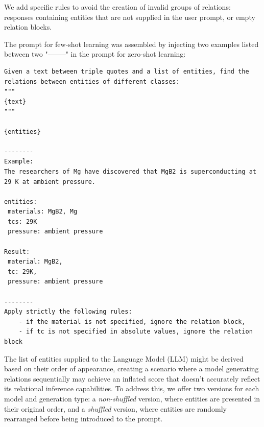 \documentclass[a4paper]{article}
\begin{document}
We add specific rules to avoid the creation of invalid groups of relations: responses containing entities that are not supplied in the user prompt, or empty relation blocks. 


    

The prompt for few-shot learning was assembled by injecting two examples listed between two "--------" in the prompt for zero-shot learning:

\begin{lstlisting}[caption=Few-shot prompting for extracting relations from lists of entities]
Given a text between triple quotes and a list of entities, find the relations between entities of different classes: 
"""
{text}
"""

{entities}

--------
Example: 
The researchers of Mg have discovered that MgB2 is superconducting at 29 K at ambient pressure.

entities:
 materials: MgB2, Mg
 tcs: 29K
 pressure: ambient pressure
 
Result: 
 material: MgB2, 
 tc: 29K, 
 pressure: ambient pressure
 
--------
Apply strictly the following rules:  
    - if the material is not specified, ignore the relation block,
    - if tc is not specified in absolute values, ignore the relation block 
\end{lstlisting}


The list of entities supplied to the Language Model (LLM) might be derived based on their order of appearance, creating a scenario where a model generating relations sequentially may achieve an inflated score that doesn't accurately reflect its relational inference capabilities. 
To address this, we offer two versions for each model and generation type: a \emph{non-shuffled} version, where entities are presented in their original order, and a \emph{shuffled} version, where entities are randomly rearranged before being introduced to the prompt.
\end{document}
